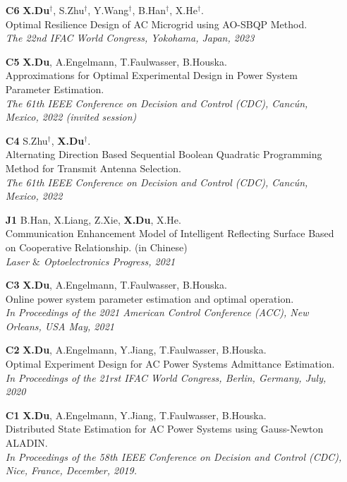 \documentclass[paper=a4,fontsize=11pt]{scrartcl} %
\begin{document}
\begin{itemize}
			
			\item [\textbf{C6}]   {\textbf{X.Du}$^{\dag}$, S.Zhu$^{\dag}$, Y.Wang$^{\dag}$, B.Han$^{\dag}$, X.He$^{\dag}$. \\
				{Optimal Resilience Design of AC Microgrid using AO-SBQP Method.}\\
				\emph{The 22nd IFAC World Congress, Yokohama, Japan, 2023
			} }
			
			\item [\textbf{C5}]   { \textbf{X.Du}, A.Engelmann, T.Faulwasser, B.Houska. \\
				{Approximations for Optimal Experimental Design
					in Power System Parameter Estimation. }\\
				\emph{ The 61th IEEE Conference on Decision and Control (CDC), Canc\'un, Mexico, 2022 (invited session)
			} }
			
			
			\item [\textbf{C4}]   { S.Zhu$^{\dag}$, \textbf{X.Du}$^{\dag}$. \\
				{Alternating Direction Based Sequential Boolean Quadratic Programming Method for Transmit Antenna Selection.}\\
				\emph{ The 61th IEEE Conference on Decision and Control (CDC), Canc\'un, Mexico, 2022
			} }
			
			\item [\textbf{J1}]   { B.Han, X.Liang, Z.Xie, \textbf{X.Du}, X.He. \\
				{Communication Enhancement Model of Intelligent Reflecting Surface Based on Cooperative Relationship. (in Chinese)}\\
				\emph{Laser $\&$ Optoelectronics Progress, 2021
			} }
			
			\item [\textbf{C3}]   { \textbf{X.Du}, A.Engelmann, T.Faulwasser, B.Houska. \\
				{Online power system parameter estimation and optimal operation.}\\
				\emph{In Proceedings of the 2021 American Control Conference (ACC), New Orleans, USA May, 2021
			} }
			
			\item [\textbf{C2}]   {\textbf{X.Du}, A.Engelmann, Y.Jiang, T.Faulwasser, B.Houska. \\
				Optimal Experiment Design for AC Power Systems Admittance Estimation.\\
				\emph{In Proceedings of the 21rst IFAC World Congress, Berlin, Germany, July, 2020
			} }
			
			\item [\textbf{C1}]  {\textbf{X.Du}, A.Engelmann, Y.Jiang, T.Faulwasser, B.Houska. \\
				Distributed State Estimation for AC Power Systems using Gauss-Newton ALADIN. \\
				\emph{In Proceedings of the 58th IEEE Conference on Decision and Control (CDC),
					Nice, France, December, 2019.} }
		\end{itemize}
\end{document}

